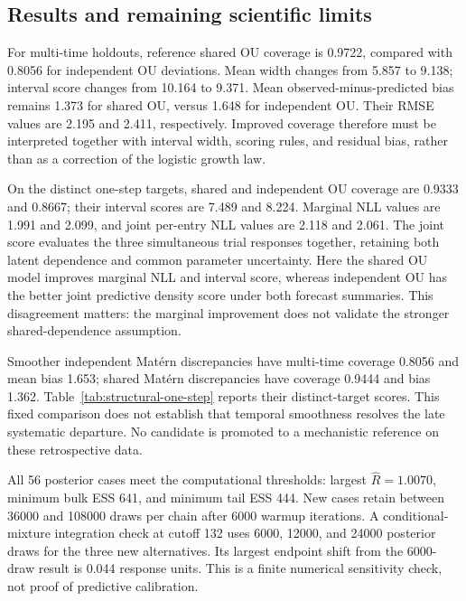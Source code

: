 
\subsection{Results and remaining scientific limits}

    For multi-time holdouts, reference shared OU coverage is
    0.9722, compared with 0.8056 for independent
    OU deviations. Mean width changes from 5.857 to
    9.138; interval score changes from
    10.164 to 9.371.
    Mean observed-minus-predicted bias remains 1.373
    for shared OU, versus 1.648 for independent OU.
    Their RMSE values are 2.195 and 2.411, respectively.
    Improved coverage therefore must be interpreted together with interval
    width, scoring rules, and residual bias, rather than as a correction of
    the logistic growth law.

    On the distinct one-step targets, shared and independent OU coverage are
    0.9333 and 0.8667; their interval scores are
    7.489 and 8.224.
    Marginal NLL values are 1.991 and
    2.099, and joint per-entry NLL values are
    2.118 and
    2.061.
    The joint score evaluates the three simultaneous trial responses together,
    retaining both latent dependence and common parameter uncertainty.
    Here the shared OU model improves marginal NLL and interval score,
    whereas independent OU has the better joint predictive density score
    under both forecast summaries. This disagreement matters: the marginal
    improvement does not validate the stronger shared-dependence assumption.

    Smoother independent Mat\'ern discrepancies have multi-time coverage
    0.8056 and mean bias
    1.653; shared Mat\'ern
    discrepancies have coverage 0.9444
    and bias 1.362.
    Table~\ref{tab:structural-one-step} reports their distinct-target scores.
    This fixed comparison does not establish that temporal smoothness resolves
    the late systematic departure. No candidate is promoted to a mechanistic
    reference on these retrospective data.

    All 56 posterior cases meet the computational thresholds: largest
    $\widehat R=1.0070$, minimum bulk ESS
    641, and minimum tail ESS
    444. New cases retain between
    36000 and
    108000 draws per chain
    after 6000 warmup iterations. A conditional-mixture integration check at
    cutoff 132 uses 6000, 12000, and 24000 posterior draws for the three new
    alternatives. Its largest endpoint shift from the 6000-draw result is
    0.044 response units.
    This is a finite numerical sensitivity check, not proof of predictive calibration.

